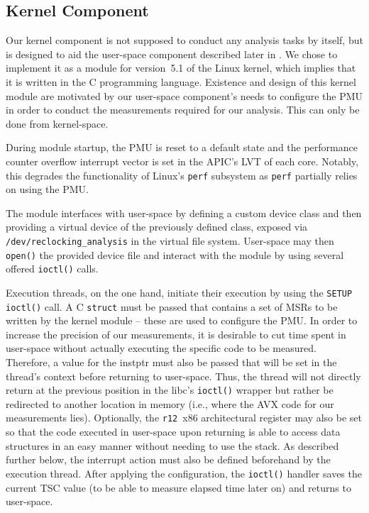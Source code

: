 \subsection{Kernel Component}
\label{sec:analysis:design:kernel}

Our kernel component is not supposed to conduct any analysis tasks by itself, but is designed to aid the user-space component described later in . We chose to implement it as a module for version~5.1 of the \gls{Linux} kernel, which implies that it is written in the C programming language. Existence and design of this kernel module are motivated by our user-space component's needs to configure the \gls{PMU} in order to conduct the measurements required for our analysis. This can only be done from kernel-space.

During module startup, the \gls{PMU} is reset to a default state and the performance counter overflow interrupt vector is set in the \gls{APIC}'s \gls{LVT} of each core. Notably, this degrades the functionality of \gls{Linux}'s \texttt{perf} subsystem as \texttt{perf} partially relies on using the \gls{PMU}.

The module interfaces with user-space by defining a custom device class and then providing a virtual device of the previously defined class, exposed via \texttt{/dev/reclocking\_analysis} in the virtual file system. User-space may then \texttt{open()} the provided device file and interact with the module by using several offered \texttt{ioctl()} calls.

Execution threads, on the one hand, initiate their execution by using the \texttt{SETUP ioctl()} call. A C \texttt{struct} must be passed that contains a set of \glspl{MSR} to be written by the kernel module -- these are used to configure the \gls{PMU}. In order to increase the precision of our measurements, it is desirable to cut time spent in user-space without actually executing the specific code to be measured. Therefore, a value for the \gls{instptr} must also be passed that will be set in the thread's context before returning to user-space. Thus, the thread will not directly return at the previous position in the \gls{libc}'s \texttt{ioctl()} wrapper but rather be redirected to another location in memory (i.e., where the \gls{AVX} code for our measurements lies). Optionally, the \texttt{r12}~\gls{x86} architectural register may also be set so that the code executed in user-space upon returning is able to access data structures in an easy manner without needing to use the stack. As described further below, the interrupt action must also be defined beforehand by the execution thread. After applying the configuration, the \texttt{ioctl()} handler saves the current \gls{TSC} value (to be able to measure elapsed time later on) and returns to user-space.


